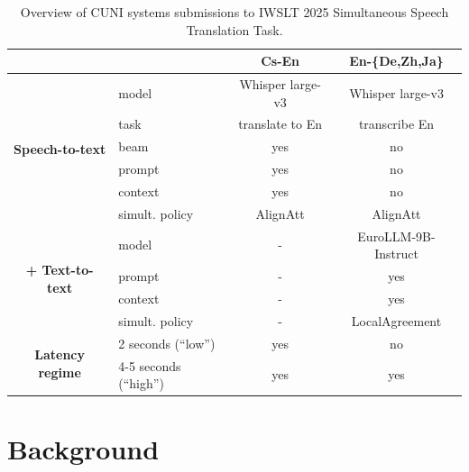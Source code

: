 \documentclass[11pt]{article}
\begin{document}
\def\yes{yes}
\def\no{no}
\def\na{-}
\begin{table}[]
    \centering
    \begin{tabular}{cl|c|c}
       &  & \textbf{Cs-En} & \textbf{En-\{De,Zh,Ja\}} \\
       \hline
\multirow{6}{*}{\textbf{Speech-to-text}} &  model & Whisper large-v3 &  Whisper large-v3       \\
& task & translate to En & transcribe En \\
& beam & \yes{}     & \no{} \\
& prompt &  \yes{}  & \no{} \\
& context &  \yes{} & \no{} \\
& simult. policy & AlignAtt & AlignAtt \\
\hline
\multirow{4}{*}{\textbf{+ Text-to-text}} 
&  model & \na{} &  EuroLLM-9B-Instruct \\
& prompt & \na{} & \yes{} \\
& context & \na{} & \yes{} \\
& simult. policy & \na{} & LocalAgreement \\
\hline
\multirow{2}{*}{\textbf{Latency regime}} 
& 2 seconds (``low'') & \yes{} & \no{} \\
& 4-5 seconds (``high'') & \yes{} & \yes{}
    \end{tabular}
    \caption{Overview of CUNI systems submissions to IWSLT 2025 Simultaneous Speech Translation Task.}
    \label{tab:overview}
\end{table}





\section{Background}
\end{document}
